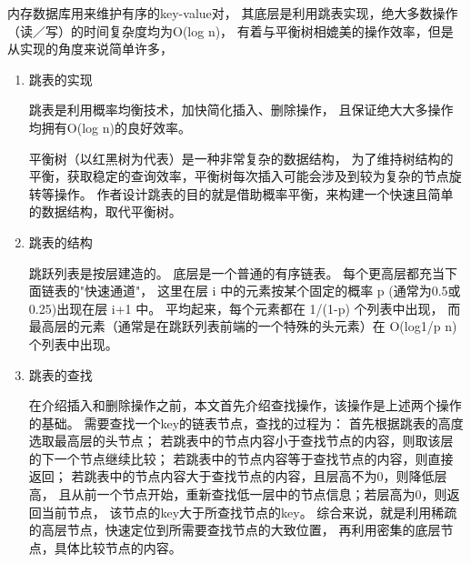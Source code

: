 		内存数据库用来维护有序的key-value对，
		其底层是利用跳表实现，绝大多数操作（读／写）的时间复杂度均为O(log n)，
		有着与平衡树相媲美的操作效率，但是从实现的角度来说简单许多，

		\begin{enumerate}
		\item 跳表的实现
		

		跳表是利用概率均衡技术，加快简化插入、删除操作，
		且保证绝大大多操作均拥有O(log n)的良好效率。
		


		平衡树（以红黑树为代表）是一种非常复杂的数据结构，
		为了维持树结构的平衡，获取稳定的查询效率，平衡树每次插入可能会涉及到较为复杂的节点旋转等操作。
		作者设计跳表的目的就是借助概率平衡，来构建一个快速且简单的数据结构，取代平衡树。



		\item 跳表的结构
		

		跳跃列表是按层建造的。
		底层是一个普通的有序链表。
		每个更高层都充当下面链表的"快速通道"，
		这里在层 i 中的元素按某个固定的概率 p (通常为0.5或0.25)出现在层 i+1 中。
		平均起来，每个元素都在 1/(1-p) 个列表中出现，
		而最高层的元素（通常是在跳跃列表前端的一个特殊的头元素）在 O(log1/p n) 个列表中出现。

		\item 跳表的查找
		
		
		在介绍插入和删除操作之前，本文首先介绍查找操作，该操作是上述两个操作的基础。
需要查找一个key的链表节点，查找的过程为：
首先根据跳表的高度选取最高层的头节点；
若跳表中的节点内容小于查找节点的内容，则取该层的下一个节点继续比较；
若跳表中的节点内容等于查找节点的内容，则直接返回；
若跳表中的节点内容大于查找节点的内容，且层高不为0，则降低层高，
且从前一个节点开始，重新查找低一层中的节点信息；若层高为0，则返回当前节点，
该节点的key大于所查找节点的key。
综合来说，就是利用稀疏的高层节点，快速定位到所需要查找节点的大致位置，
再利用密集的底层节点，具体比较节点的内容。
		


\end{enumerate}
